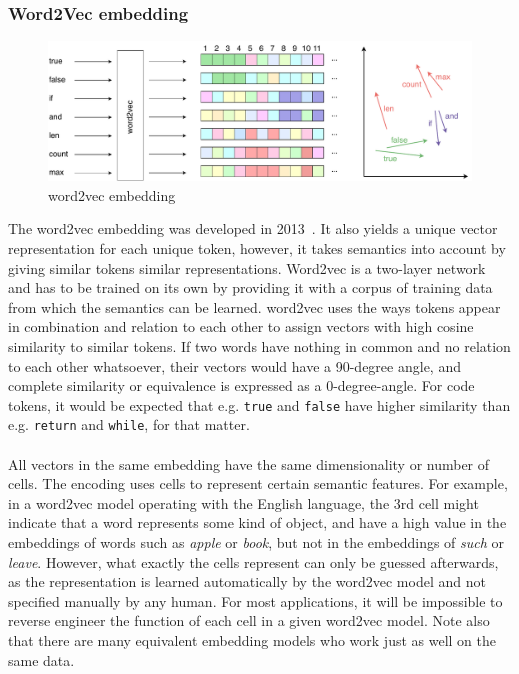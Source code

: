 \documentclass[
	a4paper,
	pagesize,
	pdftex,
	12pt,
	twoside, %
	BCOR=5mm, %
	ngerman,
	fleqn,
	final,
	]{scrartcl}
\begin{document}
\subsubsection{Word2Vec embedding}\label{word2vec}
\begin{figure}[ht]
	\centering
	\includegraphics[width=\linewidth]{img/word2vecEmbedding}
	\caption{word2vec embedding}
	\label{fig:word2vecEmbedding}
\end{figure}
The word2vec embedding was developed in 2013~\cite{Mikolov.2013}. It also yields a unique vector representation for each unique token, however, it takes semantics into account by giving similar tokens similar representations. Word2vec is a two-layer network and has to be trained on its own by providing it with a corpus of training data from which the semantics can be learned. word2vec uses the ways tokens appear in combination and relation to each other to assign vectors with high cosine similarity to similar tokens. If two words have nothing in common and no relation to each other whatsoever, their vectors would have a 90-degree angle, and complete similarity or equivalence is expressed as a 0-degree-angle. For code tokens, it would be expected that e.g. \texttt{true} and \texttt{false} have higher similarity than e.g. \texttt{return} and \texttt{while}, for that matter.\\\\
All vectors in the same embedding have the same dimensionality or number of cells. The encoding uses cells to represent certain semantic features. For example, in a word2vec model operating with the English language, the 3rd cell might indicate that a word represents some kind of object, and have a high value in the embeddings of words such as \textit{apple} or \textit{book}, but not in the embeddings of \textit{such} or \textit{leave}. However, what exactly the cells represent can only be guessed afterwards, as the representation is learned automatically by the word2vec model and not specified manually by any human. For most applications, it will be impossible to reverse engineer the function of each cell in a given word2vec model. Note also that there are many equivalent embedding models who work just as well on the same data.\\ 
\end{document}
